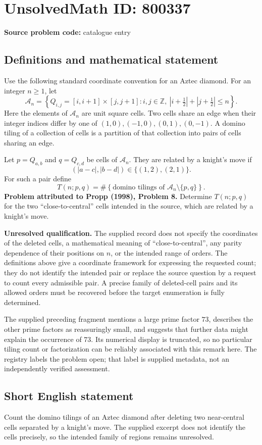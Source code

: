 \documentclass[11pt]{article}
\newcommand{\Z}{\mathbb{Z}}
\begin{document}
\section*{UnsolvedMath ID: 800337}
\textbf{Source problem code:} catalogue entry
\subsection{Definitions and mathematical statement}
Use the following standard coordinate convention for an Aztec diamond. For an integer \(n\geq 1\), let
\[
\mathcal A_n=\left\{Q_{i,j}=[i,i+1]\times[j,j+1] : i,j\in\Z,\ \left|i+\tfrac12\right|+\left|j+\tfrac12\right|\leq n\right\}.
\]
Here the elements of \(\mathcal A_n\) are unit square cells. Two cells share an edge when their integer indices differ by one of \((1,0),(-1,0),(0,1),(0,-1)\). A domino tiling of a collection of cells is a partition of that collection into pairs of cells sharing an edge.

Let \(p=Q_{a,b}\) and \(q=Q_{c,d}\) be cells of \(\mathcal A_n\). They are related by a knight's move if
\[
(|a-c|,|b-d|)\in\{(1,2),(2,1)\}.
\]
For such a pair define
\[
T(n;p,q)=\#\left\{\text{domino tilings of }\mathcal A_n\setminus\{p,q\}\right\}.
\]
\textbf{Problem attributed to Propp (1998), Problem 8.} Determine \(T(n;p,q)\) for the two ``close-to-central'' cells intended in the source, which are related by a knight's move.

\textbf{Unresolved qualification.} The supplied record does not specify the coordinates of the deleted cells, a mathematical meaning of ``close-to-central'', any parity dependence of their positions on \(n\), or the intended range of orders. The definitions above give a coordinate framework for expressing the requested count; they do not identify the intended pair or replace the source question by a request to count every admissible pair. A precise family of deleted-cell pairs and its allowed orders must be recovered before the target enumeration is fully determined.

The supplied preceding fragment mentions a large prime factor \(73\), describes the other prime factors as reassuringly small, and suggests that further data might explain the occurrence of \(73\). Its numerical display is truncated, so no particular tiling count or factorization can be reliably associated with this remark here. The registry labels the problem open; that label is supplied metadata, not an independently verified assessment.
\subsection{Short English statement}
Count the domino tilings of an Aztec diamond after deleting two near-central cells separated by a knight's move. The supplied excerpt does not identify the cells precisely, so the intended family of regions remains unresolved.
\end{document}
